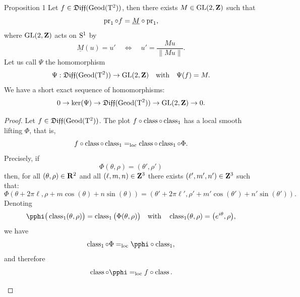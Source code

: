 \begin{Article}{Proposition 1}{}
  Let $f \in \mathfrak{Diff}(\operatorname{Geod}(\mathrm{T}^2))$,
  then there exists $M \in \mathrm{GL}(2,\mathbf{Z})$ such that
  $$%
    \Proj_1 \circ f = \underline M \circ \Proj_1,
    $$%
  where $\mathrm{GL}(2,\mathbf{Z})$ acts on $\mathrm{S}^1$ by
  $$%
    \underline M (u) =  u'
    \quad \Leftrightarrow \quad u' = \frac{M u}{\|M u\|}.
    $$%
  Let us call $\Psi$ the homomorphism
  $$%
    \Psi : \Diff(\Geod(\Torus^2)) \to \GL(2,\ZZ)
    \quad \text{with} \quad
    \Psi(f) = M.
    $$%
  We have a short exact sequence of homomorphisms:
  $$%
    0  \to  \ker(\Psi) \to \Diff(\Geod(\Torus^2)) \to \GL(2,\ZZ) \to 0.
    $$%
\end{Article}

\begin{proof}
  Let $f \in \mathfrak{Diff}(\operatorname{Geod}(\mathrm{T}^2))$.
  The plot $f \circ \operatorname{class} \circ \operatorname{class}_1$ has a local smooth lifting $\Phi$,
  that is,
  $$%
    f \circ \Class \circ \Class_1 =_\loc \Class \circ \Class_1 \circ \Phi.
    $$%
  Precisely,
  if
  $$%
    \Phi(\theta,\rho) = (\theta',\rho')
    $$%
  then,
  for all $(\theta,\rho) \in \mathbf{R}^2$ and all $(\ell,m,n) \in \mathbf{Z}^3$ there exists $(\ell',m',n') \in \mathbf{Z}^3$ such that:
  $$%
    \Phi(\theta + 2\pi\ell, \rho + m \cos(\theta) + n \sin(\theta)) = (\theta' + 2\pi\ell', \rho' + m' \cos(\theta') + n' \sin(\theta')).
    $$%
  Denoting
  $$%
    \pphi\big(\Class_1(\theta,\rho)\big) = \Class_1\big(\Phi(\theta, \rho)\big)
    \quad \text{with} \quad
    \Class_1(\theta, \rho) = \big(e^{i\theta}, \rho\big),
    $$%
  we have
  $$%
    \Class_1 \circ \Phi =_\loc \pphi \circ \Class_1,
    $$%
  and therefore
  $$%
    \Class \circ \pphi =_\loc f \circ \Class.
    $$%
  
  \begin{center}
  \end{center}
  

\end{proof}
